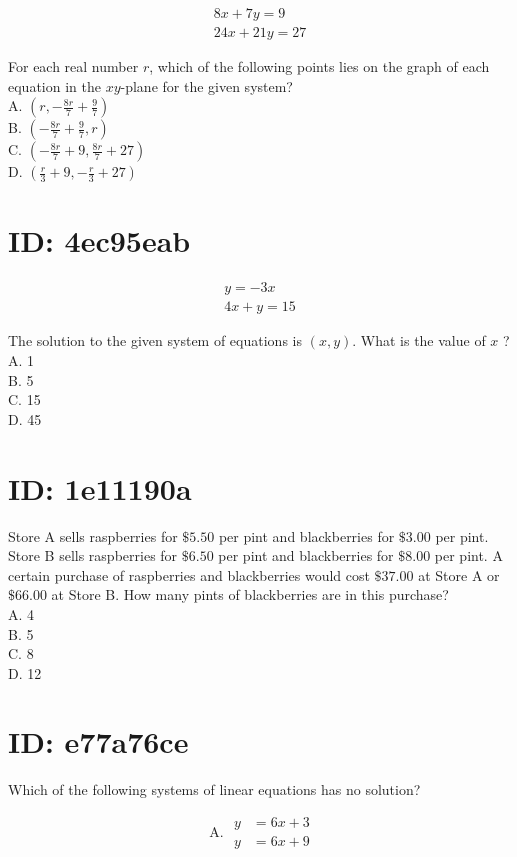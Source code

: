 $$
\begin{gathered}
8 x+7 y=9 \\
24 x+21 y=27
\end{gathered}
$$

For each real number $r$, which of the following points lies on the graph of each equation in the $x y$-plane for the given system?\\
A. $\left(r,-\frac{8 r}{7}+\frac{9}{7}\right)$\\
B. $\left(-\frac{8 r}{7}+\frac{9}{7}, r\right)$\\
C. $\left(-\frac{8 r}{7}+9, \frac{8 r}{7}+27\right)$\\
D. $\left(\frac{r}{3}+9,-\frac{r}{3}+27\right)$

\section*{ID: 4ec95eab}
$$
\begin{gathered}
y=-3 x \\
4 x+y=15
\end{gathered}
$$

The solution to the given system of equations is $(x, y)$. What is the value of $x$ ?\\
A. 1\\
B. 5\\
C. 15\\
D. 45

\section*{ID: 1e11190a}
Store A sells raspberries for $\$ 5.50$ per pint and blackberries for $\$ 3.00$ per pint. Store B sells raspberries for $\$ 6.50$ per pint and blackberries for $\$ 8.00$ per pint. A certain purchase of raspberries and blackberries would cost $\$ 37.00$ at Store A or $\$ 66.00$ at Store B. How many pints of blackberries are in this purchase?\\
A. 4\\
B. 5\\
C. 8\\
D. 12

\section*{ID: e77a76ce}
Which of the following systems of linear equations has no solution?

$$
\text { A. } \begin{aligned}
y & =6 x+3 \\
y & =6 x+9
\end{aligned}
$$

